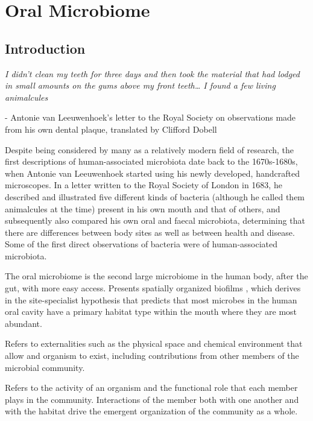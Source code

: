 \chapter{Oral Microbiome}\label{chp:oral_microbiome}

\minitoc

\section{Introduction}
\epigraph{\emph{I didn't clean my teeth for three days and then took the material that had lodged in small amounts on 
the gums above my front teeth… I found a few living animalcules}}{- Antonie van Leeuwenhoek's letter to the Royal Society 
on observations made from his own dental plaque, translated by Clifford Dobell}

Despite being considered by many as a relatively modern field of research, the first descriptions of human-associated 
microbiota date back to the 1670s-1680s, when Antonie van Leeuwenhoek started using his newly developed, handcrafted microscopes. 
In a letter written to the Royal Society of London in 1683, he described and illustrated five different kinds of bacteria 
(although he called them animalcules at the time) present in his own mouth and that of others, and subsequently also 
compared his own oral and faecal microbiota, determining that there are differences between body sites as well as between 
health and disease. Some of the first direct observations of bacteria were of human-associated microbiota.


The oral microbiome is the second large microbiome in the human body, after the gut, with more easy access. Presents spatially organized 
biofilms \cite{Welch2020,Wilbert2020}, which derives in the site-specialist hypothesis that predicts that most microbes 
in the human oral cavity have a primary habitat type within the mouth where they are most abundant. 

\begin{definition}[Habitat]
Refers to externalities such as the physical space and chemical environment that allow and organism to exist, 
including contributions from other members of the microbial community.    
\end{definition}
\begin{definition}[Niche]
Refers to the activity of an organism and the functional role that each member plays in the community. Interactions of 
the member both with one another and with the habitat drive the emergent organization of the community as a whole.
\end{definition}


